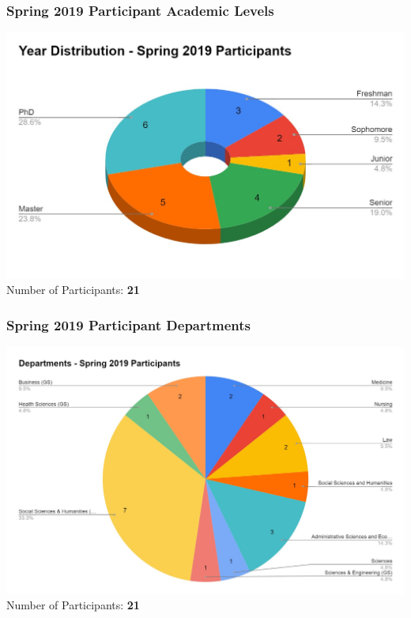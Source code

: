       \begin{frame}
        \frametitle{Spring 2019 Participant Academic Levels}
        \centering
        \includegraphics[height=0.75\textheight]{images/year_distribution_selected_spr2019.jpg}
        \LARGE
        \\
        Number of Participants: \textbf{21}
      \end{frame}

      \begin{frame}
        \frametitle{Spring 2019 Participant Departments}
        \centering
        \includegraphics[height=0.75\textheight]{images/departments_selected_spr2019.jpg}
        \LARGE
        \\
        Number of Participants: \textbf{21}
      \end{frame}

